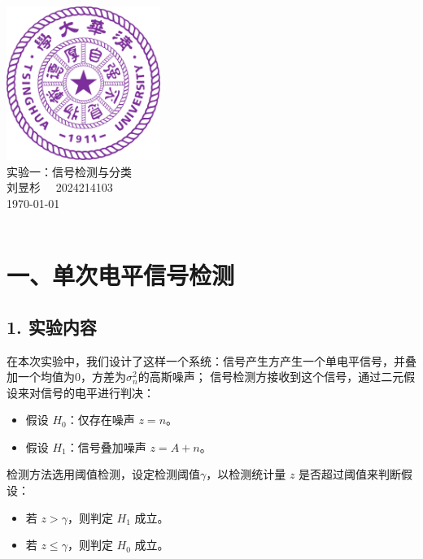 \documentclass[12pt]{ctexart}
\begin{document}
\begin{titlepage}
    \begin{center}
        \includegraphics[width=5cm]{tsinghua_logo.png}\\[4cm]  %
        {\Huge 实验一：信号检测与分类} \\[4cm]
        {\large 刘昱杉  \ \  2024214103}\\[6cm]
        {\normalsize \today}\\[1cm]
        \vfill
        \\

    \end{center}
\end{titlepage}

\section*{一、单次电平信号检测}

\subsection*{1. 实验内容}
在本次实验中，我们设计了这样一个系统：信号产生方产生一个单电平信号，并叠加一个均值为0，方差为\(\sigma_n^2\)的高斯噪声；
信号检测方接收到这个信号，通过二元假设来对信号的电平进行判决：

\begin{itemize}
    \item 假设 \( H_0 \)：仅存在噪声 \( z = n \)。
    \item 假设 \( H_1 \)：信号叠加噪声 \( z = A + n \)。
\end{itemize}

检测方法选用阈值检测，设定检测阈值\(\gamma\)，以检测统计量 \( z \) 是否超过阈值来判断假设：

\begin{itemize}
    \item 若 \( z > \gamma \)，则判定 \( H_1 \) 成立。
    \item 若 \( z \leq \gamma \)，则判定 \( H_0 \) 成立。
\end{itemize}
\end{document}
